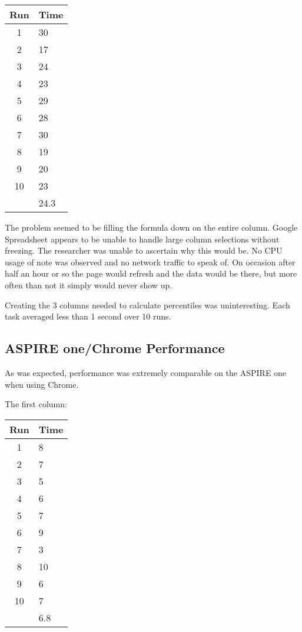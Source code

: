\begin{tabular}{| c | l |}
  \hline
  Run  & Time \\ \hline
  1    & 30   \\ \hline
  2    & 17   \\ \hline
  3    & 24   \\ \hline
  4    & 23   \\ \hline
  5    & 29   \\ \hline
  6    & 28   \\ \hline
  7    & 30   \\ \hline
  8    & 19   \\ \hline
  9    & 20   \\ \hline
  10   & 23   \\ \hline
       & 24.3 \\
  \hline
\end{tabular}

The problem seemed to be filling the formula down on the entire column.  Google
Spreadsheet appears to be unable to handle large column selections without
freezing.  The researcher was unable to ascertain why this would be.  No CPU
usage of note was observed and no network traffic to speak of.  On occasion
after half an hour or so the page would refresh and the data would be there, but
more often than not it simply would never show up.

Creating the 3 columns needed to calculate percentiles was uninteresting.  Each
task averaged less than 1 second over 10 runs.

\subsection{ASPIRE one/Chrome Performance}

As was expected, performance was extremely comparable on the ASPIRE one when
using Chrome.

The first column:

\begin{tabular}{| c | l |}
  \hline
  Run  & Time \\ \hline
  1    & 8    \\ \hline
  2    & 7    \\ \hline
  3    & 5    \\ \hline
  4    & 6    \\ \hline
  5    & 7    \\ \hline
  6    & 9    \\ \hline
  7    & 3    \\ \hline
  8    & 10   \\ \hline
  9    & 6    \\ \hline
  10   & 7    \\ \hline
       & 6.8  \\
  \hline
\end{tabular}

